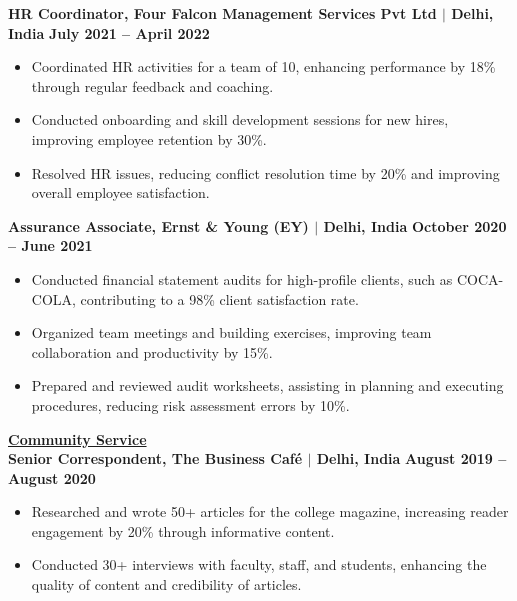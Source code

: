 \documentclass{article}
\begin{document}
\vspace{1mm}

\noindent \textbf{HR Coordinator, Four Falcon Management Services Pvt Ltd $\mid$ Delhi, India} \hfill \textbf{July 2021 – April 2022}
\begin{itemize}[noitemsep,nolistsep,leftmargin=*]
\item {\small Coordinated HR activities for a team of 10, enhancing performance by 18\% through regular feedback and coaching.}
\item {\small Conducted onboarding and skill development sessions for new hires, improving employee retention by 30\%.}
\item {\small Resolved HR issues, reducing conflict resolution time by 20\% and improving overall employee satisfaction.}
\end{itemize}

\vspace{1mm}

\noindent \textbf{Assurance Associate, Ernst \& Young (EY) $\mid$ Delhi, India} \hfill \textbf{October 2020 – June 2021}
\begin{itemize}[noitemsep,nolistsep,leftmargin=*]
\item {\small Conducted financial statement audits for high-profile clients, such as COCA-COLA, contributing to a 98\% client satisfaction rate.}
\item {\small Organized team meetings and building exercises, improving team collaboration and productivity by 15\%.}
\item {\small Prepared and reviewed audit worksheets, assisting in planning and executing procedures, reducing risk assessment errors by 10\%.}
\end{itemize}

\vspace{2mm}
%
%
\noindent \textbf{\underline{Community Service}} \\
\noindent \textbf{Senior Correspondent, The Business Café $\mid$ Delhi, India} \hfill \textbf{August 2019 – August 2020}
\begin{itemize}[noitemsep,nolistsep,leftmargin=*]
\item {\small Researched and wrote 50+ articles for the college magazine, increasing reader engagement by 20\% through informative content.}
\item {\small Conducted 30+ interviews with faculty, staff, and students, enhancing the quality of content and credibility of articles.}
\end{itemize}
\end{document}
